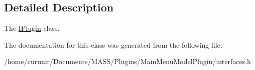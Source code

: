 \subsection{Detailed Description}
The \hyperlink{class_i_plugin}{I\+Plugin} class. 

The documentation for this class was generated from the following file\+:\begin{DoxyCompactItemize}
\item 
/home/curunir/\+Documents/\+M\+A\+S\+S/\+Plugins/\+Main\+Menu\+Model\+Plugin/interfaces.\+h\end{DoxyCompactItemize}
